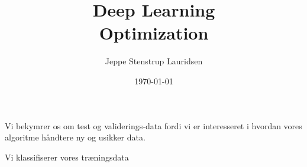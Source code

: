 \documentclass[12pt]{article}
\title{%
Deep Learning \\
\large Optimization}
\author{Jeppe Stenstrup Lauridsen}
\date{\today}
\begin{document}
\begin{titlepage}
\clearpage\maketitle
\thispagestyle{empty}
\end{titlepage}


Vi bekymrer os om test og validerings-data fordi vi er interesseret i hvordan vores algoritme håndtere ny og usikker data.

Vi klassifiserer vores træningsdata




\end{document}
